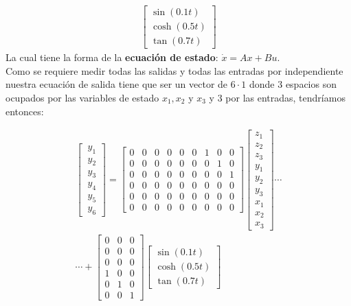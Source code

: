 \documentclass[letterpaper, 12pt]{article}
\begin{document}
\begin{enumerate}
\begin{enumerate}
\begin{multline*}
\begin{bmatrix}
\sin(0.1t)\\ 
\cosh(0.5t)\\ 
\tan(0.7t)
\end{bmatrix}
\end{multline*}
La cual tiene la forma de la \textbf{ecuación de estado}: $\dot{x}=Ax+Bu$. \\
Como se requiere medir todas las salidas y todas las entradas por independiente nuestra ecuación de salida tiene que ser un vector de $6\cdot 1$ donde 3 espacios son ocupados por las variables de estado $x_1, x_2$ y $x_3$ y 3 por las entradas, tendríamos entonces:


\begin{multline*}
\begin{bmatrix}
\ y_1\\ 
\ y_2\\ 
\ y_3\\ 
\ y_4\\ 
\ y_5\\ 
\ y_6
\end{bmatrix}
=
\begin{bmatrix}
0 &0  &0  &0  &0  &0  &1  &0  &0 \\ 
0 &0  &0  &0  &0  &0  &0  &1  &0 \\ 
0 &0  &0  &0  &0  &0  &0  &0  &1 \\ 
0 &0  &0  &0  &0  &0  &0  &0  &0 \\ 
0 &0  &0  &0  &0  &0  &0  &0  &0 \\ 
0 &0  &0  &0  &0  &0  &0  &0  &0 
\end{bmatrix}
\begin{bmatrix}
z_1\\ 
z_2\\ 
z_3\\ 
y_1\\ 
y_2\\ 
y_3\\ 
x_1\\ 
x_2\\ 
x_3
\end{bmatrix}
\cdots \\
\cdots +
\begin{bmatrix}
0  &0  &0 \\
0  &0  &0 \\
0  &0  &0 \\
1  &0  &0 \\
0  &1  &0 \\
0  &0  &1 
\end{bmatrix}
\begin{bmatrix}
\sin(0.1t)\\ 
\cosh(0.5t)\\ 
\tan(0.7t)
\end{bmatrix}
\end{multline*}




\end{enumerate}
\end{enumerate}
\end{document}
